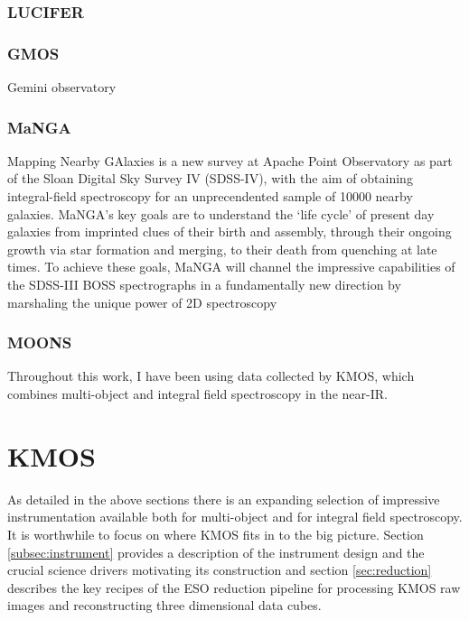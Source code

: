 \documentclass{literature}
\begin{document}
\subsubsection{LUCIFER}\label{LUCIFER}

\subsubsection{GMOS}
Gemini observatory 

\subsubsection{MaNGA}\label{subsubsec:MaNGA}
Mapping Nearby GAlaxies is a new survey at Apache Point Observatory as part of the Sloan Digital Sky Survey IV (SDSS-IV), with the aim of obtaining integral-field spectroscopy for an unprecendented sample of 10000 nearby galaxies. MaNGA's key goals are to understand the `life cycle' of present day galaxies from imprinted clues of their birth and assembly, through their ongoing growth via star formation and merging, to their death from quenching at late times. To achieve these goals, MaNGA will channel the impressive capabilities of the SDSS-III BOSS spectrographs in a fundamentally new direction by marshaling the unique power of 2D spectroscopy

\subsubsection{MOONS}\label{subsubsec:MOONS}
Throughout this work, I have been using data collected by KMOS, which combines multi-object and integral field spectroscopy in the near-IR. 

\section{KMOS}\label{sec:KMOS}
As detailed in the above sections there is an expanding selection of impressive instrumentation available both for multi-object and for integral field spectroscopy. It is worthwhile to focus on where KMOS fits in to the big picture. Section \ref{subsec:instrument} provides a description of the instrument design and the crucial science drivers motivating its construction and section \ref{sec:reduction} describes the key recipes of the ESO reduction pipeline for processing KMOS raw images and reconstructing three dimensional data cubes. 
\end{document}
